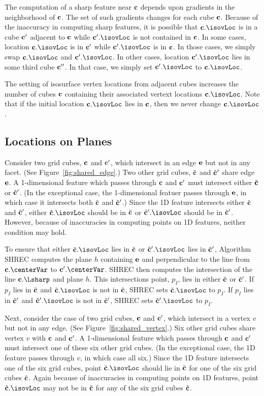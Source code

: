 The computation of a sharp feature near $\mathbf{c}$ depends
upon gradients in the neighborhood of $\mathbf{c}$.
The set of such gradients changes for each cube $\mathbf{c}$.
Because of the inaccuracy in computing sharp features,
it is possible that $\cb.\isovLoc$ is in a cube $\mathbf{c}'$ adjacent to $\mathbf{c}$
while $\cb'.\isovLoc$ is not contained in $\mathbf{c}$.
In some cases,
location $\cb.\isovLoc$ is in $\mathbf{c}'$ while $\cb'.\isovLoc$ is in $\mathbf{c}$.
In those cases,
we simply swap $\cb.\isovLoc$ and $\cb'.\isovLoc$.
In other cases, location $\cb'.\isovLoc$ lies in some third cube $\mathbf{c}''$.
In that case, we simply set $\cb'.\isovLoc$ to $\cb.\isovLoc$.

The setting of isosurface vertex locations from adjacent cubes
increases the number of cubes $\mathbf{c}$ containing 
their associated vertext locations $\cb.\isovLoc$.
Note that if the initial location $\cb.\isovLoc$ lies in $\mathbf{c}$,
then we never change $\cb.\isovLoc$.


\subsection{Locations on Planes}

Consider two grid cubes, $\mathbf{c}$ and $\mathbf{c}'$, 
which intersect in an edge $\mathbf{e}$ but not in any facet.
(See Figure~\ref{fig:shared_edge}.)
Two other grid cubes, ${\tilde{\mathbf{c}}}$ and ${\tilde{\mathbf{c}}}'$ share edge $\mathbf{e}$.
A 1-dimensional feature which passes through $\mathbf{c}$ and $\mathbf{c}'$ must intersect
either ${\tilde{\mathbf{c}}}$ or ${\tilde{\mathbf{c}}}'$.
(In the exceptional case, the 1-dimensional featuer passes through $\mathbf{e}$,
in which case it intersects both ${\tilde{\mathbf{c}}}$ and ${\tilde{\mathbf{c}}}'$.)
Since the 1D feature intersects either ${\tilde{\mathbf{c}}}$ and ${\tilde{\mathbf{c}}}'$,
either $\tcb.\isovLoc$ should be in ${\tilde{\mathbf{c}}}$ 
or $\tcb'.\isovLoc$ should be in ${\tilde{\mathbf{c}}}'$.
However, because of inaccuracies in computing points on 1D features,
neither condition may hold.

To ensure that either $\tcb.\isovLoc$ lies in ${\tilde{\mathbf{c}}}$
or $\tcb'.\isovLoc$ lies in ${\tilde{\mathbf{c}}}'$,
Algorithm SHREC computes the plane $h$ containing $\mathbf{e}$
and perpendicular to the line from $\cb.\centerVar$ to $\cb'.\centerVar$.
SHREC then computes the intersection of the line $\cb.\Lsharp$ 
and plane $h$.
This intersections point, $p_I$, lies in either ${\tilde{\mathbf{c}}}$ or ${\tilde{\mathbf{c}}}'$.
If $p_I$ lies in ${\tilde{\mathbf{c}}}$ and $\tcb.\isovLoc$ is not in ${\tilde{\mathbf{c}}}$,
SHREC sets $\tcb.\isovLoc$ to $p_I$.
If $p_I$ lies in ${\tilde{\mathbf{c}}}'$ and $\tcb'.\isovLoc$ is not in ${\tilde{\mathbf{c}}}'$,
SHREC sets $\tcb'.\isovLoc$ to $p_I$.

Next, consider the case of two grid cubes, $\mathbf{c}$ and $\mathbf{c}'$, 
which intersect in a vertex $v$ but not in any edge.
(See Figure~\ref{fig:shared_vertex}.)
Six other grid cubes share vertex $v$ with $\mathbf{c}$ and $\mathbf{c}'$.
A 1-dimensional feature which passes through $\mathbf{c}$ and $\mathbf{c}'$ must intersect
one of these six other grid cubes.
(In the exceptional case, the 1D feature passes through $v$,
in which case all six.)
Since the 1D feature intersects one of the six grid cubes,
point $\tcb.\isovLoc$ should lie in ${\tilde{\mathbf{c}}}$ for one of the six grid cubes ${\tilde{\mathbf{c}}}$.
Again because of inaccuracies in computing points on 1D features,
point $\tcb.\isovLoc$ may not be in ${\tilde{\mathbf{c}}}$ for any of the six grid cubes ${\tilde{\mathbf{c}}}$.

